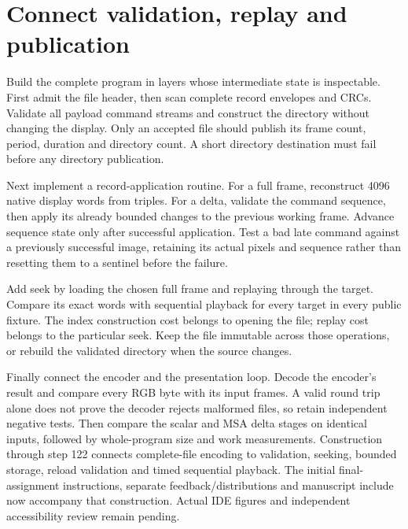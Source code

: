 \section{Connect validation, replay and publication}
Build the complete program in layers whose intermediate state is inspectable.
First admit the file header, then scan complete record envelopes and CRCs. Validate
all payload command streams and construct the directory without changing the display.
Only an accepted file should publish its frame count, period, duration and directory
count. A short directory destination must fail before any directory publication.

Next implement a record-application routine. For a full frame, reconstruct 4096
native display words from triples. For a delta, validate the command sequence, then
apply its already bounded changes to the previous working frame. Advance sequence
state only after successful application. Test a bad late command against a previously
successful image, retaining its actual pixels and sequence rather than resetting them
to a sentinel before the failure.

Add seek by loading the chosen full frame and replaying through the target. Compare
its exact words with sequential playback for every target in every public fixture.
The index construction cost belongs to opening the file; replay cost belongs to the
particular seek. Keep the file immutable across those operations, or rebuild the
validated directory when the source changes.

Finally connect the encoder and the presentation loop. Decode the encoder's result
and compare every RGB byte with its input frames. A valid round trip alone does not
prove the decoder rejects malformed files, so retain independent negative tests.
Then compare the scalar and MSA delta stages on identical inputs, followed by
whole-program size and work measurements. Construction through step 122 connects complete-file encoding to validation,
seeking, bounded storage, reload validation and timed sequential playback. The
initial final-assignment instructions, separate feedback/distributions and manuscript
include now accompany that construction. Actual IDE figures and independent
accessibility review remain pending.
